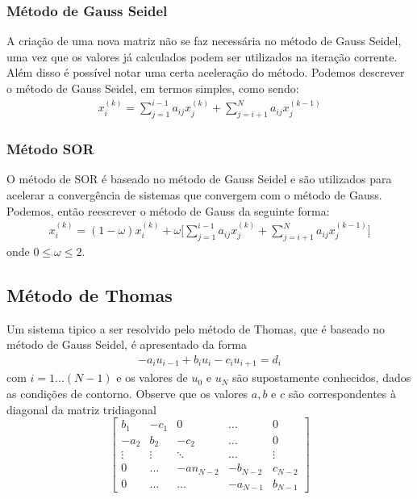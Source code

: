 \documentclass{article}
\begin{document}
			\subsubsection{Método de Gauss Seidel} %
			\label{ssub:m_todo_de_gauss_seidel}
				A criação de uma nova matriz não se faz necessária no método de Gauss Seidel, uma vez que os valores já calculados podem ser utilizados na iteração corrente. Além disso é possível notar uma certa aceleração do método. Podemos descrever o método de Gauss Seidel, em termos simples, como sendo:
				\begin{eqnarray*}
					x_i^{(k)} = \sum_{j=1}^{i-1} a_{ij}x_j^(k) + \sum_{j=i+1}^{N} a_{ij}x_j^{(k-1)}
				\end{eqnarray*}

			\subsubsection{Método SOR} %
			\label{ssub:m_todo_sor}
				O método de SOR é baseado no método de Gauss Seidel e são utilizados para acelerar a convergência de sistemas que convergem com o método de Gauss. Podemos, então reescrever o método de Gauss da seguinte forma:
				\begin{eqnarray}
					x_i^{(k)} = (1-\omega) x_i^{(k)}  + \omega \Bigg[\sum_{j=1}^{i-1} a_{ij}x_j^(k) + \sum_{j=i+1}^{N} a_{ij}x_j^{(k-1)} \Bigg]
				\end{eqnarray}
				onde $0 \le \omega \le 2$. \nocite{burden2008analise} 

		\subsection{Método de Thomas} %
		\label{sub:m_todo_de_thomas}
			Um sistema tipico a ser resolvido pelo método de Thomas, que é baseado no método de Gauss Seidel, é apresentado da forma
			\begin{eqnarray}
				-a_i u_{i-1} + b_i u_{i} - c_i u_{i+1} = d_i \label{eqn:thomas}
			\end{eqnarray}
			com $i = 1...(N-1)$ e os valores de $u_0$ e $u_N$ são supostamente conhecidos, dados as condições de contorno. Observe que os valores $a, b$ e $c$ são correspondentes à diagonal da matriz tridiagonal
			$$\begin{bmatrix}
				b_1 	& -c_1 	& 0  	&  \dots 	& 0\\
				-a_2 	& b_2 	& -c_2 	&  \dots 	& 0\\
				\vdots 	& \vdots& \ddots& \dots 	& \vdots\\
				0 		& \dots & -an_{N-2} & -b_{N-2}	& c_{N-2}\\
				0 		& \dots & \dots & -a_{N-1}	& b_{N-1}
			\end{bmatrix}$$
\end{document}
